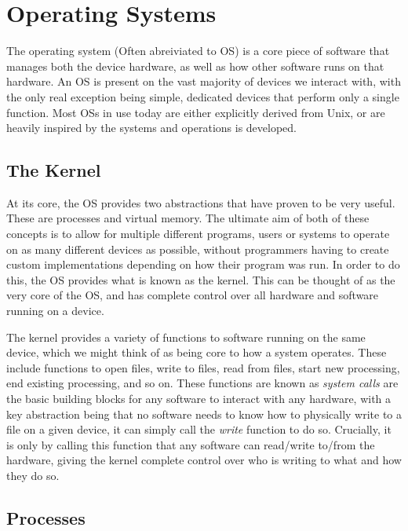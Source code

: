\chapter{Operating Systems}
\label{chap:os}

The operating system (Often abreiviated to OS) is a core piece of software that manages both the device hardware, as well as how other software runs on that hardware. An OS is present on the vast majority of devices we interact with, with the only real exception being simple, dedicated devices that perform only a single function.  Most OSs in use today are either explicitly derived from Unix, or are heavily inspired by the systems and operations is developed. 

\section{The Kernel}

At its core, the OS provides two abstractions that have proven to be very useful. These are processes and virtual memory. The ultimate aim of both of these concepts is to allow for multiple different programs, users or systems to operate on as many different devices as possible, without programmers having to create custom implementations depending on how their program was run. In order to do this, the OS provides what is known as the kernel. This can be thought of as the very core of the OS, and has complete control over all hardware and software running on a device.

The kernel provides a variety of functions to software running on the same device, which we might think of as being core to how a system operates. These include functions to open files, write to files, read from files, start new processing, end existing processing, and so on. These functions are known as \textit{system calls} are the basic building blocks for any software to interact with any hardware, with a key abstraction being that no software needs to know how to physically write to a file on a given device, it can simply call the \textit{write} function to do so. Crucially, it is only by calling this function that any software can read/write to/from the hardware, giving the kernel complete control over who is writing to what and how they do so.

\section{Processes}

